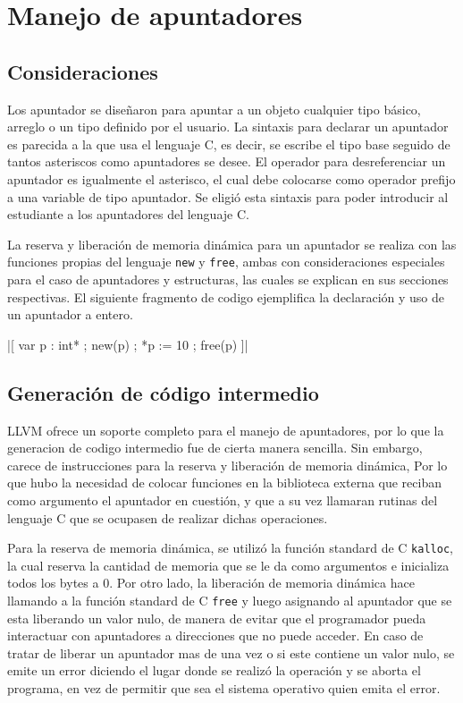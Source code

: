 \section{Manejo de apuntadores}
  
\subsection{Consideraciones}
Los apuntador se diseñaron para apuntar a un objeto cualquier tipo básico,
arreglo o un tipo definido por el usuario. La sintaxis para declarar un
apuntador es parecida a la que usa el lenguaje C, es decir, se escribe el tipo
base seguido de tantos asteriscos como apuntadores se desee. El operador para
desreferenciar un apuntador es igualmente el asterisco, el cual debe colocarse
como operador prefijo a una variable de tipo apuntador. Se eligió esta
sintaxis para poder introducir al estudiante a los apuntadores del lenguaje C.

La reserva y liberación de memoria dinámica para un apuntador se realiza con las funciones propias del lenguaje \texttt{new} y \texttt{free}, ambas con consideraciones especiales para el caso de apuntadores y estructuras, las cuales se explican en sus secciones respectivas. El siguiente fragmento de codigo ejemplifica la declaración y uso de un apuntador a entero.

\begin{gracielacode}
  |[ var p : int*
  ;  new(p)
  ;  *p := 10
  ;  free(p)
  ]|
\end{gracielacode}

\subsection{Generación de código intermedio}
LLVM ofrece un soporte completo para el manejo de apuntadores, por lo que la generacion de codigo intermedio fue de cierta manera sencilla. Sin embargo, carece de instrucciones para la reserva y liberación de memoria dinámica, Por lo que hubo la necesidad de colocar funciones en la biblioteca externa que reciban como argumento el apuntador en cuestión, y que a su vez llamaran rutinas del lenguaje C que se ocupasen de realizar dichas operaciones.

Para la reserva de memoria dinámica, se utilizó la función standard de C \texttt{kalloc}, la cual reserva la cantidad de memoria que se le da como argumentos e inicializa todos los bytes a 0. Por otro lado, la liberación de memoria dinámica hace llamando a la función standard de C \texttt{free} y luego asignando al apuntador que se esta liberando un valor nulo, de manera de evitar que el programador pueda interactuar con apuntadores a direcciones que no puede acceder. En caso de tratar de liberar un apuntador mas de una vez o si este contiene un valor nulo, se emite un error diciendo el lugar donde se realizó la operación y se aborta el programa, en vez de permitir que sea el sistema operativo quien emita el error.


